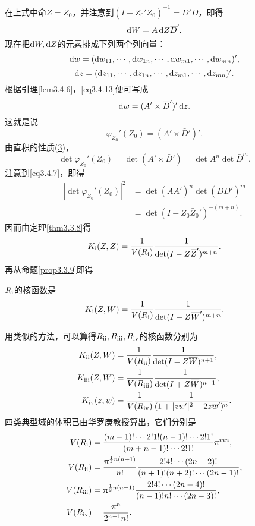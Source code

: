 在上式中命$Z=Z_0$，并注意到$(I-\bar{Z}_0'Z_0)^{-1}=\bar{D}'D$，即得
\begin{equation}\label{eq3.4.13}
	\mathop{}\!\mathrm{d} W=A\mathop{}\!\mathrm{d} Z{}\mkern1mu\overline{\mkern-1muD}'.
\end{equation}
现在把$\mathop{}\!\mathrm{d} W,\mathop{}\!\mathrm{d} Z$的元素排成下列两个列向量：
\[\mathop{}\!\mathrm{d} w=(\mathop{}\!\mathrm{d} w_{11},\cdots,\mathop{}\!\mathrm{d} w_{1n},\cdots,\mathop{}\!\mathrm{d} w_{m1},\cdots,\mathop{}\!\mathrm{d} w_{mn})',\]
\[\mathop{}\!\mathrm{d} z=(\mathop{}\!\mathrm{d} z_{11},\cdots,\mathop{}\!\mathrm{d} z_{1n},\cdots,\mathop{}\!\mathrm{d} z_{m1},\cdots,\mathop{}\!\mathrm{d} z_{mn})'.\]
根据引理\ref{lem3.4.6}，\eqref{eq3.4.13}便可写成
\[\mathop{}\!\mathrm{d} w=(A'\times{}\mkern1mu\overline{\mkern-1muD}')'\mathop{}\!\mathrm{d} z.\]
这就是说
\[\varphi_{Z_0}'(Z_0)=(A'\times\bar{D}')'.\]
由直积的性质\hyperlink{3.4.3.1}{(3)}，
\[\det\varphi_{Z_0}'(Z_0)=\det(A'\times\bar{D}')=\det A^n\det\bar{D}^m.\]
注意到\eqref{eq3.4.7}，即得
\begin{align*}
	|\det\varphi_{Z_0}'(Z_0)|^2
	&=\det(A\bar{A}')^n\det(D\bar{D}')^m\\
	&=\det(I-Z_0\bar{Z}_0')^{-(m+n)}.
\end{align*}
因而由定理\ref{thm3.3.8}得
\[K_{\text{\uppercase\expandafter{\romannumeral1}}}(Z,Z)=\frac1{V(R_{\text{\uppercase\expandafter{\romannumeral1}}})}\frac1{\det(I-Z\bar{Z}')^{m+n}}.\]
再从命题\ref{prop3.3.9}即得
\begin{theorem}\label{thm3.4.7}
	$R_{\text{\uppercase\expandafter{\romannumeral1}}}$的核函数是
	\[K_{\text{\uppercase\expandafter{\romannumeral1}}}(Z,W)=\frac1{V(R_{\text{\uppercase\expandafter{\romannumeral1}}})}\frac1{\det(I-Z\bar{W}')^{m+n}}.\]
\end{theorem}
用类似的方法，可以算得$R_{\text{\uppercase\expandafter{\romannumeral2}}},R_{\text{\uppercase\expandafter{\romannumeral3}}},R_{\text{\uppercase\expandafter{\romannumeral4}}}$的核函数分别为
\begin{align*}
	K_{\text{\uppercase\expandafter{\romannumeral2}}}(Z,W)
	&=\frac1{V(R_{\text{\uppercase\expandafter{\romannumeral2}}})}\frac1{\det(I-Z\bar{W})^{n+1}},\\
	K_{\text{\uppercase\expandafter{\romannumeral3}}}(Z,W)
	&=\frac1{V(R_{\text{\uppercase\expandafter{\romannumeral3}}})}\frac1{\det(I+Z\bar{W})^{n-1}},\\
	K_{\text{\uppercase\expandafter{\romannumeral4}}}(z,w)
	&=\frac1{V(R_{\text{\uppercase\expandafter{\romannumeral4}}})}\frac1{(1+|zw'|^2-2z\bar{w}')^n}.
\end{align*}
四类典型域的体积已由华罗庚教授\cite{华罗庚1958多复变数函数论中的典型域的调和分析}算出，它们分别是
\begin{align*}
	V(R_{\text{\uppercase\expandafter{\romannumeral1}}})
	&=\frac{(m-1)!\cdots 2!1!(n-1)!\cdots2!1!}{(m+n-1)!\cdots2!1!}\pi^{mn},\\
	V(R_{\text{\uppercase\expandafter{\romannumeral2}}})
	&=\frac{\pi^{\frac12 n(n+1)}}{n!}\frac{2!4!\cdots (2n-2)!}{(n+1)!(n+2)!\cdots (2n-1)!},\\
	V(R_{\text{\uppercase\expandafter{\romannumeral3}}})&=\pi^{\frac12 n(n-1)}\frac{2!4!\cdots(2n-4)!}{(n-1)!n!\cdots(2n-3)!},\\
	V(R_{\text{\uppercase\expandafter{\romannumeral4}}})
	&=\frac{\pi^n}{2^{n-1}n!}.
\end{align*}
